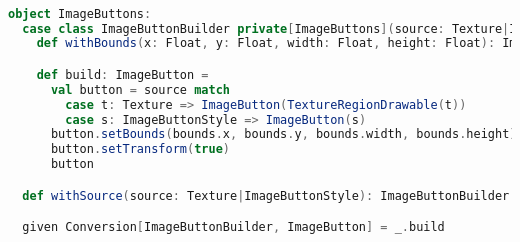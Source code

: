 \begin{lstlisting}[language=Scala, label=code:image-buttons, caption=Builder pattern per ImageButtons]

object ImageButtons:
  case class ImageButtonBuilder private[ImageButtons](source: Texture|ImageButtonStyle, bounds: Rectangle = Rectangle(0, 0, 0, 0)):
    def withBounds(x: Float, y: Float, width: Float, height: Float): ImageButtonBuilder = copy(bounds = Rectangle(x, y, width, height))

    def build: ImageButton =
      val button = source match
        case t: Texture => ImageButton(TextureRegionDrawable(t))
        case s: ImageButtonStyle => ImageButton(s)
      button.setBounds(bounds.x, bounds.y, bounds.width, bounds.height)
      button.setTransform(true)
      button

  def withSource(source: Texture|ImageButtonStyle): ImageButtonBuilder = ImageButtonBuilder(source)

  given Conversion[ImageButtonBuilder, ImageButton] = _.build
  
\end{lstlisting}